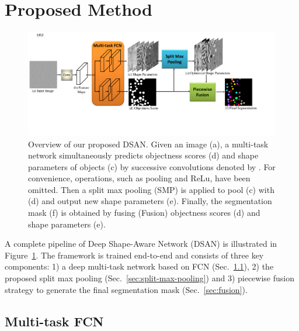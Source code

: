 \section{Proposed Method}
\label{sec:method}


\begin{figure}
    \begin{center}
        \includegraphics[width=6.7in]{figures/FigDSAN.pdf}
    \end{center}
    \caption{Overview of our proposed DSAN. Given an image (a), a multi-task network simultaneously predicts objectness scores (d) and shape parameters of objects (c) by successive convolutions denoted by .
    For convenience, operations, such as pooling and ReLu, have been omitted.
    Then a split max pooling (SMP) is applied to pool (c) with (d) and output new shape parameters (e).
    Finally, the segmentation mask (f) is obtained by fusing (Fusion) objectness scores (d) and shape parameters (e).}
    \label{FigDSAN}
\end{figure}

A complete pipeline of Deep Shape-Aware Network (DSAN) is illustrated in Figure~\ref{FigDSAN}.
The framework is trained end-to-end and consists of three key components:
1) a deep multi-task network based on FCN (Sec.~\ref{sec:multi-task-fcn}),
2) the proposed split max pooling (Sec.~\ref{sec:split-max-pooling}) and
3) piecewise fusion strategy to generate the final segmentation mask (Sec.~\ref{sec:fusion}).

\subsection{Multi-task FCN}
\label{sec:multi-task-fcn}


